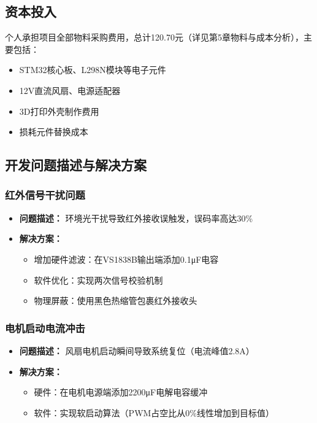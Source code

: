 \subsection{资本投入}
个人承担项目全部物料采购费用，总计120.70元（详见第5章物料与成本分析），主要包括：
\begin{itemize}
    \item STM32核心板、L298N模块等电子元件
    \item 12V直流风扇、电源适配器
    \item 3D打印外壳制作费用
    \item 损耗元件替换成本
\end{itemize}

\subsection{开发问题描述与解决方案}

\subsubsection{红外信号干扰问题}
\begin{itemize}
    \item \textbf{问题描述：} 环境光干扰导致红外接收误触发，误码率高达30\%
    \item \textbf{解决方案：}
    \begin{itemize}
        \item 增加硬件滤波：在VS1838B输出端添加0.1μF电容
        \item 软件优化：实现两次信号校验机制
        \item 物理屏蔽：使用黑色热缩管包裹红外接收头
    \end{itemize}
\end{itemize}

\subsubsection{电机启动电流冲击}
\begin{itemize}
    \item \textbf{问题描述：} 风扇电机启动瞬间导致系统复位（电流峰值2.8A）
    \item \textbf{解决方案：}
    \begin{itemize}
        \item 硬件：在电机电源端添加2200μF电解电容缓冲
        \item 软件：实现软启动算法（PWM占空比从0\%线性增加到目标值）
    \end{itemize}
\end{itemize}


